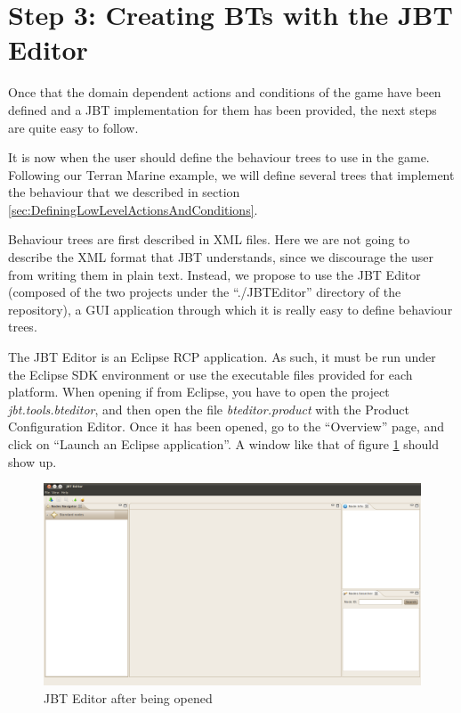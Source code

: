 \documentclass[a4paper]{article}
\begin{document}
\section{Step 3: Creating BTs with the JBT Editor}\label{sec:CreatingBTsWithTheJBTEditor}

Once that the domain dependent actions and conditions of the game have been defined and a JBT implementation for them has been provided, the next steps are quite easy to follow. 

It is now when the user should define the behaviour trees to use in the game. Following our Terran Marine example, we will define several trees that implement the behaviour that we described in section \ref{sec:DefiningLowLevelActionsAndConditions}.

Behaviour trees are first described in XML files. Here we are not going to describe the XML format that JBT understands, since we discourage the user from writing them in plain text. Instead, we propose to use the JBT Editor (composed of the two projects under the ``./JBTEditor'' directory of the repository), a GUI application through which it is really easy to define behaviour trees.

The JBT Editor is an Eclipse RCP application. As such, it must be run under the Eclipse SDK environment or use the executable files provided for each platform. When opening if from Eclipse, you have to open the project \textit{jbt.tools.bteditor}, and then open the file \textit{bteditor.product} with the Product Configuration Editor. Once it has been opened, go to the ``Overview'' page, and click on ``Launch an Eclipse application''. A window like that of figure \ref{fig:JBTEditor} should show up.

\begin{figure}
 \centering
 \includegraphics[width=\textwidth]{./Images/JBTEditor.png}
 \caption{JBT Editor after being opened}
 \label{fig:JBTEditor}
\end{figure}
\end{document}
